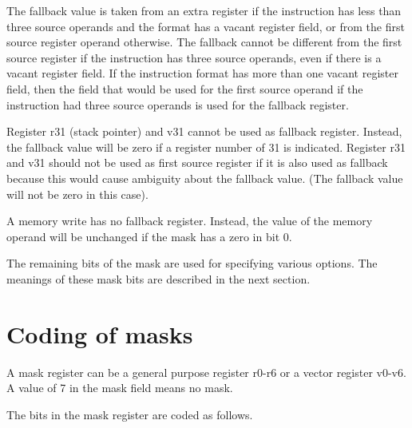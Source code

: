 \documentclass[forwardcom.tex]{subfiles}
\begin{document}
The fallback value is taken from an extra register if the instruction has less than three source operands and the format has a vacant register field, or from the first source register operand otherwise. The fallback cannot be different from the first source register if the instruction has three source operands, even if there is a vacant register field. 
If the instruction format has more than one vacant register field, then the field that would be used for the first source operand if the instruction had three source operands is used for the fallback register.
\vv

Register r31 (stack pointer) and v31 cannot be used as fallback register. Instead, the fallback value will be zero if a register number of 31 is indicated. 
Register r31 and v31 should not be used as first source register if it is also used as fallback because this would cause ambiguity about the fallback value. (The fallback value will not be zero in this case).
\vv

A memory write has no fallback register. Instead, the value of the memory operand will be unchanged if the mask has a zero in bit 0.
\vv

The remaining bits of the mask are used for specifying various options.
The meanings of these mask bits are described in the next section.
\vv

\section{Coding of masks}
A mask register can be a general purpose register r0-r6 or a vector register v0-v6. A value of 7 in the mask field means no mask.
\vv

The bits in the mask register are coded as follows.
\end{document}
